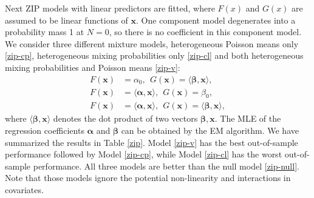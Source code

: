 \documentclass[11pt]{article}
\numberwithin{equation}{section}
\def\bx{\boldsymbol{x}}
\begin{document}
Next ZIP models with linear predictors are fitted, where $F(x)$ and $G(x)$ are assumed to be linear functions of $\bx$.
One component model degenerates into a probability mass 1 at $N=0$, so there is no coefficient in this component model. 
We consider three different mixture models,  heterogeneous Poisson means only  \eqref{zip-cp},  heterogeneous mixing probabilities only \eqref{zip-cl} and both heterogeneous  mixing probabilities and Poisson means \eqref{zip-v}:
\begin{align}
	F(\bx)&=\alpha_0, ~~G(\bx)=\langle \boldsymbol{\beta}, \bx\rangle, \label{zip-cp} \\
	F(\bx)&=\langle \boldsymbol{\alpha},\bx\rangle, ~~G(\bx)=\beta_0, \label{zip-cl} \\
	F(\bx)&=\langle \boldsymbol{\alpha},\bx \rangle, ~~G(\bx)=\langle \boldsymbol{\beta}, \bx \rangle, \label{zip-v}
\end{align}  
where $\langle \boldsymbol{\beta}, \bx \rangle$ denotes the dot product of two vectors $\boldsymbol{\beta}, \bx$. The MLE of the regression coefficients $\boldsymbol{\alpha}$ and $\boldsymbol{\beta}$ can be obtained by the EM algorithm.
We have summarized the results in Table \ref{zip}.
Model \eqref{zip-v} has the best out-of-sample performance followed by Model \eqref{zip-cp}, while Model \eqref{zip-cl} has the worst out-of-sample performance.
All three models are better than the null model \eqref{zip-null}.
Note that those models ignore the potential non-linearity and interactions in covariates.
\end{document}
